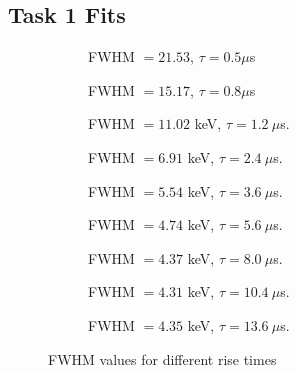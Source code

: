 \documentclass{article}
\begin{document}
\begin{appendices}

\section{Task 1 Fits}
\label{appendix:Task1}

\begin{figure}[h!]
	\centering
	\begin{subfigure}{0.45\textwidth}
		\centering
		\scalebox{0.5}{}
		\caption{FWHM $= 21.53$, $\tau = 0.5 \mu$s }
		\label{fig:1}
	\end{subfigure}
	\begin{subfigure}{0.45\textwidth}
		\centering
		\scalebox{0.5}{}
		\caption{FWHM $= 15.17$, $\tau = 0.8\mu$s}
		\label{fig:2}
	\end{subfigure}
	\begin{subfigure}{0.45\textwidth}
		\centering
		\scalebox{0.5}{}
		\caption{FWHM $= 11.02$ keV, $\tau = 1.2 \ \mu$s.}
		\label{fig:3}
	\end{subfigure}
	\begin{subfigure}{0.45\textwidth}
		\centering
		\scalebox{0.5}{}
		\caption{FWHM $= 6.91$ keV, $\tau = 2.4 \ \mu$s.}
		\label{fig:4}
	\end{subfigure}
	\begin{subfigure}{0.45\textwidth}
		\centering
		\scalebox{0.5}{}
		\caption{FWHM $= 5.54$ keV, $\tau = 3.6 \ \mu$s.}
		\label{fig:5}
	\end{subfigure}
	\begin{subfigure}{0.45\textwidth}
		\centering
		\scalebox{0.5}{}
		\caption{FWHM $= 4.74$ keV, $\tau = 5.6 \ \mu$s.}
		\label{fig:6}
	\end{subfigure}
	\begin{subfigure}{0.45\textwidth}
		\centering
		\scalebox{0.5}{}
		\caption{FWHM $= 4.37$ keV, $\tau = 8.0 \ \mu$s.}
		\label{fig:7}
	\end{subfigure}
	\begin{subfigure}{0.45\textwidth}
		\centering
		\scalebox{0.5}{}
		\caption{FWHM $= 4.31$ keV, $\tau = 10.4 \ \mu$s.}
		\label{fig:8}
	\end{subfigure}
	\begin{subfigure}{0.45\textwidth}
		\centering
		\scalebox{0.5}{}
		\caption{FWHM $= 4.35$ keV, $\tau = 13.6 \ \mu$s.}
		\label{fig:9}
	\end{subfigure}
	\caption{FWHM values for different rise times}
	\label{fig:Task 1}
\end{figure}



\end{appendices}

\pagebreak{}

 
 
\end{document}
